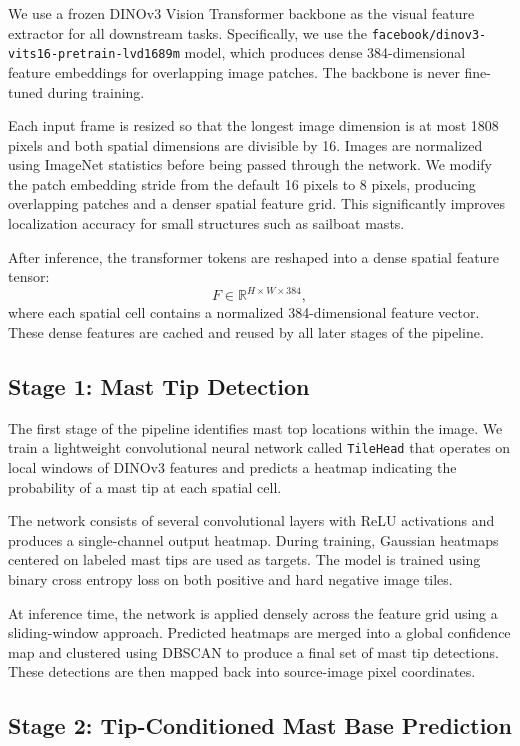 We use a frozen DINOv3 Vision Transformer backbone as the visual feature extractor for all downstream tasks. Specifically, we use the \texttt{facebook/dinov3-vits16-pretrain-lvd1689m} model, which produces dense 384-dimensional feature embeddings for overlapping image patches. The backbone is never fine-tuned during training.

Each input frame is resized so that the longest image dimension is at most 1808 pixels and both spatial dimensions are divisible by 16. Images are normalized using ImageNet statistics before being passed through the network. We modify the patch embedding stride from the default 16 pixels to 8 pixels, producing overlapping patches and a denser spatial feature grid. This significantly improves localization accuracy for small structures such as sailboat masts.

After inference, the transformer tokens are reshaped into a dense spatial feature tensor:
\begin{equation}
F \in \mathbb{R}^{H \times W \times 384},
\end{equation}
where each spatial cell contains a normalized 384-dimensional feature vector. These dense features are cached and reused by all later stages of the pipeline.

\subsection{Stage 1: Mast Tip Detection}

The first stage of the pipeline identifies mast top locations within the image. We train a lightweight convolutional neural network called \texttt{TileHead} that operates on local windows of DINOv3 features and predicts a heatmap indicating the probability of a mast tip at each spatial cell.

The network consists of several convolutional layers with ReLU activations and produces a single-channel output heatmap. During training, Gaussian heatmaps centered on labeled mast tips are used as targets. The model is trained using binary cross entropy loss on both positive and hard negative image tiles.

At inference time, the network is applied densely across the feature grid using a sliding-window approach. Predicted heatmaps are merged into a global confidence map and clustered using DBSCAN to produce a final set of mast tip detections. These detections are then mapped back into source-image pixel coordinates.

\subsection{Stage 2: Tip-Conditioned Mast Base Prediction}

